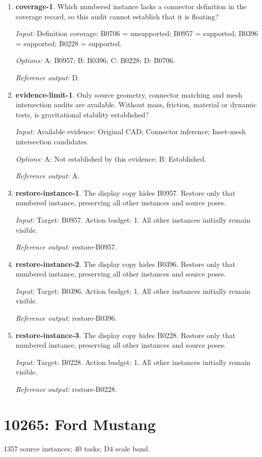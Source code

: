 \begin{enumerate}
\item \textbf{coverage-1}. Which numbered instance lacks a connector definition in the coverage record, so this audit cannot establish that it is floating?\par {\small \textit{Input:} Definition coverage: B0706 = unsupported; B0957 = supported; B0396 = supported; B0228 = supported. \par\textit{Options:} A: B0957; B: B0396; C: B0228; D: B0706. \par\textit{Reference output:} D.}
\item \textbf{evidence-limit-1}. Only source geometry, connector matching and mesh intersection audits are available. Without mass, friction, material or dynamic tests, is gravitational stability established?\par {\small \textit{Input:} Available evidence: Original CAD; Connector inference; Inset-mesh intersection candidates. \par\textit{Options:} A: Not established by this evidence; B: Established. \par\textit{Reference output:} A.}
\item \textbf{restore-instance-1}. The display copy hides B0957. Restore only that numbered instance, preserving all other instances and source poses.\par {\small \textit{Input:} Target: B0957. Action budget: 1. All other instances initially remain visible. \par\textit{Reference output:} restore-B0957.}
\item \textbf{restore-instance-2}. The display copy hides B0396. Restore only that numbered instance, preserving all other instances and source poses.\par {\small \textit{Input:} Target: B0396. Action budget: 1. All other instances initially remain visible. \par\textit{Reference output:} restore-B0396.}
\item \textbf{restore-instance-3}. The display copy hides B0228. Restore only that numbered instance, preserving all other instances and source poses.\par {\small \textit{Input:} Target: B0228. Action budget: 1. All other instances initially remain visible. \par\textit{Reference output:} restore-B0228.}
\end{enumerate}
\clearpage
\section{10265: Ford Mustang}
1357 source instances; 40 tasks; D4 scale band.

